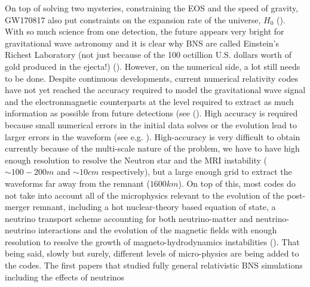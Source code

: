 On top of solving two mysteries, constraining the EOS and the speed of gravity, GW170817 also put constraints on the expansion rate of the universe, $H_0$ (\cite{ligo2017gravitational}). With so much science from one detection, the future appears very bright for gravitational wave astronomy and it is clear why BNS are called Einstein's Richest Laboratory (not just because of the 100 octillion U.S. dollars worth of gold produced in the ejecta!) (\cite{baiotti2016binary}). However, on the numerical side, a lot still needs to be done. Despite continuous developments, current numerical relativity codes have not yet reached the accuracy required to model the gravitational wave signal and the electronmagnetic counterparts at the level required to extract as much information as possible from future detections (see (\cite{baiotti2016binary}). High accuracy is required because small numerical errors in the initial data solves or the evolution lead to larger errors in the waveform (see e.g. \cite{tsokaros2016initialfixed}). High-accuracy is very difficult to obtain currently because of the multi-scale nature of the problem, we have to have high enough resolution to resolve the Neutron star and the MRI instability ($\sim 100-200m$ and $\sim 10cm$ respectively), but a large enough grid to extract the waveforms far away from the remnant ($1600 km$). On top of this, most codes do not take into account all of the microphysics relevant to the evolution of the post-merger remnant, including a hot nuclear-theory based equation of state, a neutrino transport scheme accounting for both neutrino-matter and neutrino-neutrino interactions and the evolution of the magnetic fields with enough resolution to resolve the growth of magneto-hydrodynamics instabilities (\cite{foucart2015low}). That being said, slowly but surely, different levels of micro-physics are being added to the codes. The first papers that studied fully general relativistic BNS simulations including the effects of neutrinos
